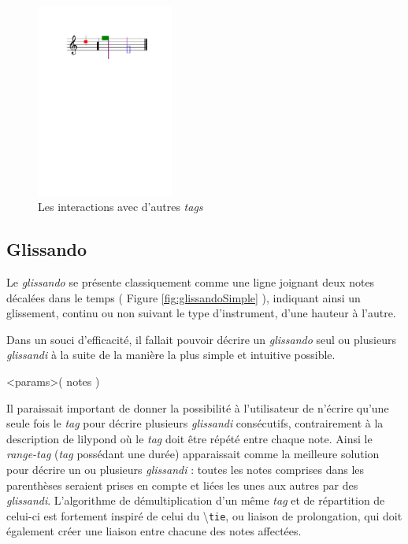 \documentclass{article}
\newenvironment{gmncode}	{\vspace{-2mm}\small\verbatim}{\endverbatim\vspace{-2mm}}
\newcommand{\code}[1]		{{\small \texttt{#1}}}
\newcommand{\guidotag}[1]	{\textbackslash\code{#1}}
\begin{document}
%
\begin{figure}[h]
\centering
\begin{gmncode}
[
  \cluster<color="red", hdx=1, hdy=3>({a})
  \cluster<size=0.5>({f,c2})
  \noteFormat<color="purple">
  \headsReverse
  \cluster<color="green", size=2>({f, g2})
  \cluster<"blue">({d1/2, g})
]
\end{gmncode}
\includegraphics[width=45mm]{img/partitions/clusterInteractions.pdf}
\caption{Les interactions avec d'autres \emph{tags}}
\label{fig:clusterInteractions}
\end{figure}
%


\subsection{Glissando}\label{subsec:glissando}

Le \emph{glissando} se présente classiquement comme une ligne joignant deux notes décalées dans le temps ( Figure \ref{fig:glissandoSimple} ), indiquant ainsi un glissement, continu ou non suivant le type d'instrument, d'une hauteur à l'autre.

Dans un souci d'efficacité, il fallait pouvoir décrire un \emph{glissando} seul ou plusieurs \emph{glissandi} à la suite de la manière la plus simple et intuitive possible. 

\begin{gmncode}
  \glissando<params>( notes )
\end{gmncode}

Il paraissait important de donner la possibilité à l'utilisateur de n'écrire qu'une seule fois le \emph{tag} pour décrire plusieurs \emph{glissandi} consécutifs, contrairement à la description de lilypond où le \emph{tag} doit être répété entre chaque note. Ainsi le \emph{range-tag} (\emph{tag} possédant une durée) apparaissait comme la meilleure solution pour décrire un ou plusieurs \emph{glissandi} : toutes les notes comprises dans les parenthèses seraient prises en compte et liées les unes aux autres par des \emph{glissandi}. L'algorithme de démultiplication d'un même \emph{tag} et de répartition de celui-ci est fortement inspiré de celui du \guidotag{tie}, ou liaison de prolongation, qui doit également créer une liaison entre chacune des notes affectées.
\end{document}
